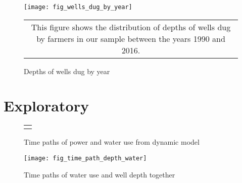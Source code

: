 \documentclass{article}
\numberwithin{table}{section}
\begin{document}
\renewcommand{\tabcolsep}{8pt}


\renewcommand{\tabcolsep}{10pt}


\renewcommand{\tabcolsep}{2pt}


\renewcommand{\tabcolsep}{8pt}






\clearpage

\begin{figure}[htbp]
	\centering\caption{Depths of wells dug by year\label{fig:wellsDugByYear}}
	\texttt{[image: fig\_wells\_dug\_by\_year]}
	\begin{tabular*}{1.0\hsize}{c}
		\multicolumn{1}{p{1.0\hsize}}{\footnotesize This figure shows the distribution of depths of wells dug by farmers in our sample between the years 1990 and 2016.}\\
	\end{tabular*}
\end{figure}





\clearpage

\section{Exploratory}

\begin{figure}[htbp]
	\centering
	\caption{Time paths of power and water use from dynamic model}
	\subfiguretopcaptrue
	\begin{tabular*}{1.0\textwidth}{c}
		\multicolumn{1}{p{1.0\hsize}}{\footnotesize }\\
	\end{tabular*}
\end{figure}

\begin{figure}
	\centering
	\caption{Time paths of water use and well depth together}
	\texttt{[image: fig\_time\_path\_depth\_water]}
\end{figure}
\end{document}
